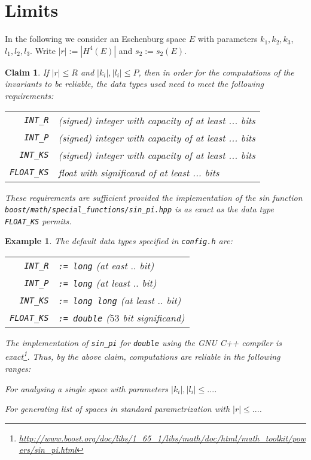 \documentclass{article}
\newtheorem{eg}[thm]{Example}
\newtheorem{claim}[thm]{Claim}
\newcommand{\abs}[1]{\left|#1\right|}
\begin{document}
\section*{Limits}
In the following we consider an Eschenburg space \(E\) with parameters \(k_1,k_2,k_3\), \(l_1,l_2,l_3\).  Write \(\abs{r} := |H^4(E)|\) and \(s_2 := s_2(E)\).

\begin{claim}
  If \(\abs{r} \leq R\) and \(\abs{k_i},\abs{l_i} \leq P\), then in order for the computations of the invariants to be reliable, the data types used need to meet the following requirements:
  \begin{center}
    \begin{tabular}{rp{20em}}
      \verb+INT_R+ & (signed) integer with capacity of at least ... bits \\
      \verb+INT_P+ & (signed) integer with capacity of at least ... bits \\
      \verb+INT_KS+ & (signed) integer with capacity of at least ... bits \\
      \verb+FLOAT_KS+ & float with significand of at least ... bits
    \end{tabular}
  \end{center}
  These requirements are sufficient provided the implementation of the sin function  \verb+boost/math/special_functions/sin_pi.hpp+
  is as exact as the data type \verb+FLOAT_KS+ permits.
\end{claim}

\begin{eg}
  The default data types specified in \verb+config.h+ are:
  \begin{center}
    \begin{tabular}{rp{20em}}
      \verb+INT_R+ & \texttt{:= long} (at east $..$ bit) \\
      \verb+INT_P+ & \texttt{:= long} (at least $..$ bit) \\
      \verb+INT_KS+ & \texttt{:= long long} (at least $..$ bit) \\
      \verb+FLOAT_KS+ & \texttt{:= double} ($53$ bit significand)
    \end{tabular}
  \end{center}
  The implementation of \verb+sin_pi+ for \texttt{double} using the GNU C++ compiler is exact\footnote{%
    \url{http://www.boost.org/doc/libs/1_65_1/libs/math/doc/html/math_toolkit/powers/sin_pi.html}}.
  Thus, by the above claim, computations are reliable in the following ranges:
  \begin{compactitem}
  \item For analysing a single space with parameters \(\abs{k_i}, \abs{l_i} \leq ...\).

  \item  For generating list of spaces in standard parametrization with \(\abs{r} \leq ...\).    
  \end{compactitem}
\end{eg}
\end{document}
